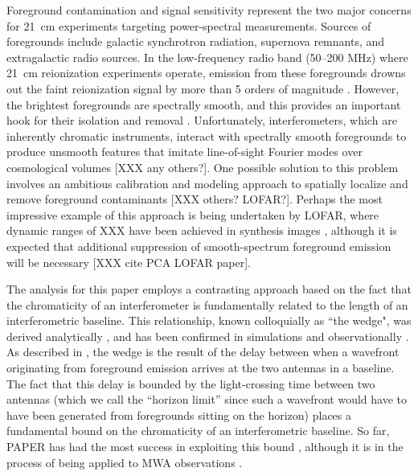 \documentclass[twocolumn,numberedappendix]{emulateapj} \shorttitle{PSA64}
\begin{document}
Foreground contamination and signal sensitivity represent the two major concerns for 21~cm
experiments targeting power-spectral measurements. Sources of foregrounds include
galactic synchrotron radiation, supernova remnants, and extragalactic radio sources.
In the low-frequency radio band (50--200 MHz) where 21~cm reionization experiments operate,
emission from these foregrounds
drowns out the faint reionization signal by more than 5 orders of magnitude
\citep{deoliveira2008,jelic_et_al2008,santos_et_al2005}.
However, the brightest foregrounds are spectrally smooth, and this provides an important hook
for their isolation and removal \citep{liu_et_al2009,liu_tegmark2012}.  Unfortunately, interferometers, which are inherently chromatic
instruments, interact with spectrally smooth foregrounds to produce unsmooth features that
imitate line-of-sight Fourier modes over cosmological volumes \citep{bowman_et_al2009,morales_et_al2006a} [XXX any others?].
One possible solution to this problem involves an ambitious calibration and modeling approach to spatially localize and
remove foreground contaminants \citep{harker_et_al2009,liu_et_al2008,juddEarly} [XXX others? LOFAR?].  
Perhaps the most impressive example of this approach is being undertaken by LOFAR, where dynamic ranges of XXX have
been achieved in synthesis images \citep{yattawatta_et_al2013}, although it is expected that additional
suppression of smooth-spectrum foreground emission will be necessary [XXX cite PCA LOFAR paper].

The analysis for this paper employs a contrasting
approach based on the fact that the chromaticity of an interferometer
is fundamentally related to the length of an interferometric baseline.  This relationship, known
colloquially as ``the wedge", was 
derived analytically \citep{parsons_et_al2012b,vedantham_et_al2012}, and has been confirmed in 
simulations \citep{datta_et_al2010,hazelton_et_al2013} and observationally
\citep{pober_et_al2013,dillon_et_al2013b}.  As described in \citep{parsons_et_al2012b}, the wedge is the result of the delay
between when a wavefront originating from foreground emission
arrives at the two antennas in a baseline.  The fact that this delay is bounded by the light-crossing
time between two antennas (which we call the ``horizon limit'' since such a wavefront would have to have
been generated from foregrounds sitting on the horizon) places a fundamental bound on the chromaticity of
an interferometric baseline.  So far, PAPER has had the most success in exploiting this bound
\citep{parsons_et_al2014,jacobs_et_al2014}, although it is in the process of being applied to MWA
observations \citep{nitya}.  
\end{document}
